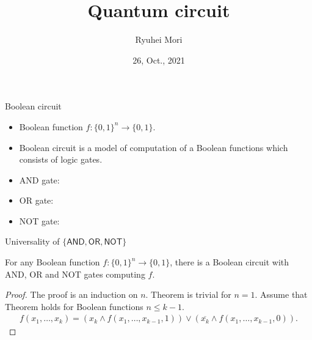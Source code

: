 \documentclass{beamer}
\title{Quantum circuit}
\author{Ryuhei Mori}
\institute{Tokyo Institute of Technology}
\date{26, Oct., 2021}
\newcommand\emm[1]{\textcolor{redorange}{{#1}}}
\begin{document}
\begin{frame}[plain]
\maketitle
\end{frame}



\begin{frame}{Boolean circuit}
\begin{itemize}
\setlength{\itemsep}{2em}
\item Boolean function $f\colon \{0,1\}^n\to\{0,1\}$.
\item \emm{Boolean circuit} is a model of computation of a Boolean functions which consists of logic \emm{gates}.
\item AND gate:
\item OR gate:
\item NOT gate:
\end{itemize}
\end{frame}

\begin{frame}{Universality of $\{\mathsf{AND}, \mathsf{OR},\mathsf{NOT}\}$}
\begin{theorem}
For \emm{any} Boolean function $f\colon \{0,1\}^n\to\{0,1\}$, there is a Boolean circuit with AND, OR and NOT gates computing $f$.
\end{theorem}
\begin{proof}
The proof is an induction on $n$. Theorem is trivial for $n=1$.
Assume that Theorem holds for Boolean functions $n \le k-1$.
\begin{align*}
f(x_1,\dotsc,x_k) = (x_k \wedge f(x_1,\dotsc,x_{k-1}, 1)) \vee (\overline{x_k} \wedge f(x_1,\dotsc,x_{k-1}, 0)).
\end{align*}
\end{proof}
\end{frame}
\end{document}

